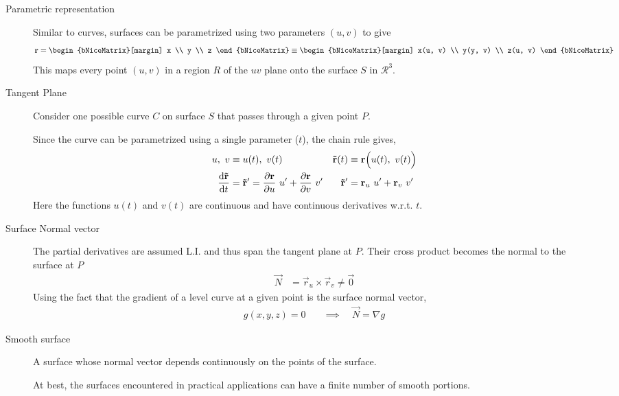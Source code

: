 \begin{description}
    \item[Parametric representation] Similar to curves, surfaces can be parametrized
        using two parameters $ (u, v) $ to give
        \begin{align}
            \vec{r} & = \begin{bNiceMatrix}[margin]
                            x \\ y \\ z
                        \end{bNiceMatrix} \equiv
            \begin{bNiceMatrix}[margin]
                x(u, v) \\ y(y, v) \\ z(u, v)
            \end{bNiceMatrix}
        \end{align}
        This maps every point $ (u, v) $ in a region $ R $ of the $ uv $ plane onto
        the surface $ S $ in $ \mathcal{R}^3 $.

    \item[Tangent Plane] Consider one possible curve $ C $ on surface $ S $ that passes
        through a given point $ P $. \par
        Since the curve can be parametrized using a single parameter ($ t $), the chain
        rule gives,
        \begin{align}
            u,\ v                      & \equiv u(t),\ v(t)                  &
            \vec{\tilde{r}}(t)         & \equiv \vec{r}\Big(u(t),\ v(t)\Big)   \\
            \diff {\vec{\tilde{r}}}{t} & = \vec{\tilde{r}}'
            = \diffp {\vec{r}}{u}\ u'
            + \diffp {\vec{r}}{v}\ v'  &
            \vec{\tilde{r}}'           & = \vec{r}_u\ u' + \vec{r}_v\ v'
        \end{align}
        Here the functions $ u(t) $ and $ v(t) $ are continuous and have continuous
        derivatives w.r.t. $ t $.

    \item[Surface Normal vector] The partial derivatives are assumed L.I. and thus span
        the tangent plane at $ P $. Their cross product becomes the normal to the surface
        at $ P $
        \begin{align}
            \vec{N} & = \vec{r}_u \times \vec{r}_v \neq \vec{0}
        \end{align}
        Using the fact that the gradient of a level curve at a given point is the
        surface normal vector,
        \begin{align}
            g(x, y, z) = 0 \quad & \implies \quad \vec{N} = \nabla g
        \end{align}

    \item[Smooth surface] A surface whose normal vector depends continuously on the
        points of the surface.  \par
        At best, the surfaces encountered in practical applications can have a finite
        number of smooth portions.
\end{description}

